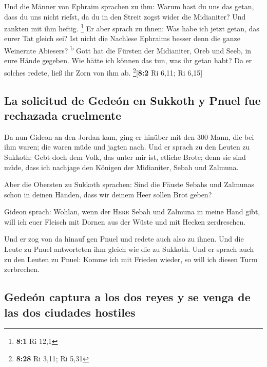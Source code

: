  Und die Männer von Ephraim sprachen zu ihm: Warum hast du
uns das getan, dass du uns nicht riefst, da du in den Streit zogst wider
die Midianiter? Und zankten mit ihm heftig. \footnote{\textbf{8:1} Ri
  12,1}  Er aber sprach zu ihnen: Was habe ich jetzt
getan, das eurer Tat gleich sei? Ist nicht die Nachlese Ephraims besser
denn die ganze Weinernte Abiesers? \textsuperscript{b} 
Gott hat die Fürsten der Midianiter, Oreb und Seeb, in eure Hände
gegeben. Wie hätte ich können das tun, was ihr getan habt? Da er solches
redete, ließ ihr Zorn von ihm ab. \footnote{\textbf{8:28} Ri 3,11; Ri
  5,31}{[}\textbf{8:2} Ri 6,11; Ri 6,15{]}

\hypertarget{la-solicitud-de-gedeuxf3n-en-sukkoth-y-pnuel-fue-rechazada-cruelmente}{%
\subsection{La solicitud de Gedeón en Sukkoth y Pnuel fue rechazada
cruelmente}\label{la-solicitud-de-gedeuxf3n-en-sukkoth-y-pnuel-fue-rechazada-cruelmente}}

 Da nun Gideon an den Jordan kam, ging er hinüber mit den
300 Mann, die bei ihm waren; die waren müde und jagten nach.
 Und er sprach zu den Leuten zu Sukkoth: Gebt doch dem
Volk, das unter mir ist, etliche Brote; denn sie sind müde, dass ich
nachjage den Königen der Midianiter, Sebah und Zalmuna.

 Aber die Obersten zu Sukkoth sprachen: Sind die Fäuste
Sebahs und Zalmunas schon in deinen Händen, dass wir deinem Heer sollen
Brot geben?

 Gideon sprach: Wohlan, wenn der \textsc{Herr} Sebah und
Zalmuna in meine Hand gibt, will ich euer Fleisch mit Dornen aus der
Wüste und mit Hecken zerdreschen.

 Und er zog von da hinauf gen Pnuel und redete auch also
zu ihnen. Und die Leute zu Pnuel antworteten ihm gleich wie die zu
Sukkoth.  Und er sprach auch zu den Leuten zu Pnuel: Komme
ich mit Frieden wieder, so will ich diesen Turm zerbrechen.

\hypertarget{gedeuxf3n-captura-a-los-dos-reyes-y-se-venga-de-las-dos-ciudades-hostiles}{%
\subsection{Gedeón captura a los dos reyes y se venga de las dos
ciudades
hostiles}\label{gedeuxf3n-captura-a-los-dos-reyes-y-se-venga-de-las-dos-ciudades-hostiles}}

